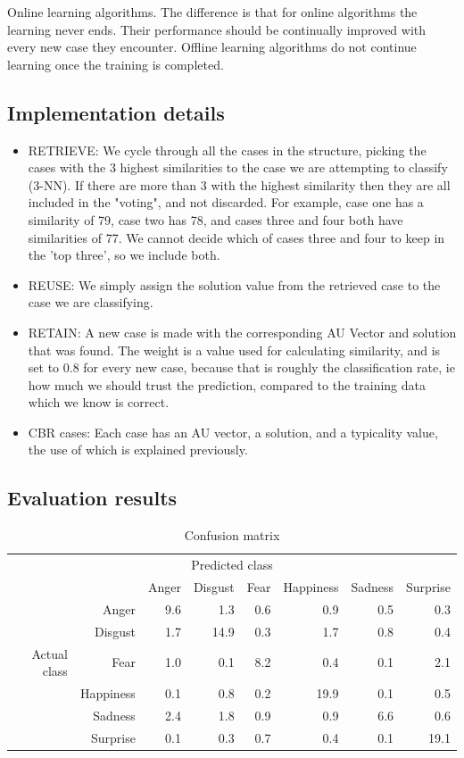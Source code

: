 \documentclass[12pt]{article}
\begin{document}
Online learning algorithms. The difference is that for online algorithms the learning never ends. Their performance should be continually improved with every new case they encounter. Offline learning algorithms do not continue learning once the training is completed.

\subsection*{Implementation details}
\begin{itemize}
  \item RETRIEVE:
    We cycle through all the cases in the structure, picking the cases with the 3 highest similarities to the case we are attempting to classify (3-NN). If there are more than 3 with the highest similarity then they are all included in the "voting", and not discarded. For example, case one has a similarity of 79, case two has 78, and cases three and four both have similarities of 77. We cannot decide which of cases three and four to keep in the 'top three', so we include both.
  \item REUSE:
    We simply assign the solution value from the retrieved case to the case we are classifying.
  \item RETAIN:
    A new case is made with the corresponding AU Vector and solution that was found. The weight is a value used for calculating similarity, and is set to 0.8 for every new case, because that is roughly the classification rate, ie how much we should trust the prediction, compared to the training data which we know is correct.
  \item CBR cases:
    Each case has an AU vector, a solution, and a typicality value, the use of which is explained previously.
\end{itemize}

\subsection*{Evaluation results}

\begin{table}
\centering
\begin{tabular}{r r | r r r r r r}
\multicolumn{8}{c}{Predicted class} \\
&  & Anger & Disgust & Fear & Happiness & Sadness & Surprise \\
\hline
 & Anger            & 9.6 & 1.3  & 0.6 & 0.9  & 0.5 & 0.3  \\
 & Disgust          & 1.7 & 14.9 & 0.3 & 1.7  & 0.8 & 0.4  \\
Actual class & Fear & 1.0 & 0.1  & 8.2 & 0.4  & 0.1 & 2.1  \\
 & Happiness        & 0.1 & 0.8  & 0.2 & 19.9 & 0.1 & 0.5  \\
 & Sadness          & 2.4 & 1.8  & 0.9 & 0.9  & 6.6 & 0.6  \\
 & Surprise         & 0.1 & 0.3  & 0.7 & 0.4  & 0.1 & 19.1 \\
\end{tabular} 
\caption{Confusion matrix}
\end{table}
\end{document}
